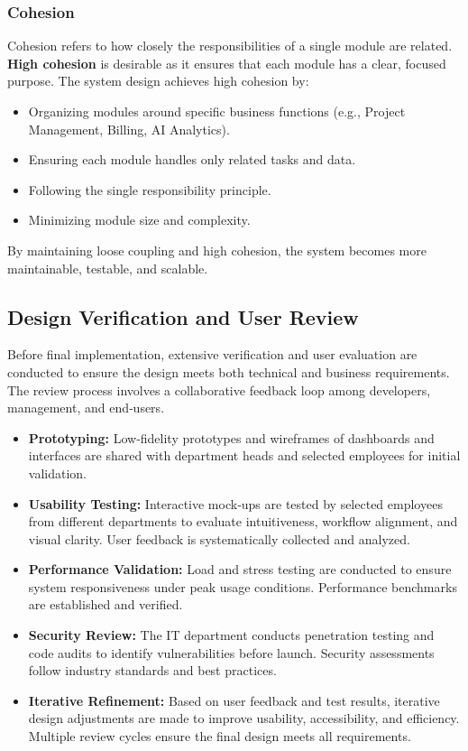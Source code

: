 \documentclass[12pt,a4paper]{article}
\begin{document}
\subsubsection{Cohesion}
Cohesion refers to how closely the responsibilities of a single module are related.  \textbf{High cohesion} is desirable as it ensures that each module has a clear, focused purpose.  The system design achieves high cohesion by:
\begin{itemize}
    \item Organizing modules around specific business functions (e.g., Project Management, Billing, AI Analytics).
    \item Ensuring each module handles only related tasks and data.
    \item Following the single responsibility principle.
    \item Minimizing module size and complexity.
\end{itemize}

By maintaining loose coupling and high cohesion, the system becomes more maintainable, testable, and scalable.

\subsection{Design Verification and User Review}
Before final implementation, extensive verification and user evaluation are conducted to ensure the design meets both technical and business requirements.  The review process involves a collaborative feedback loop among developers, management, and end‑users.

\begin{itemize}
    \item \textbf{Prototyping:} Low‑fidelity prototypes and wireframes of dashboards and interfaces are shared with department heads and selected employees for initial validation.
    
    \item \textbf{Usability Testing:} Interactive mock‑ups are tested by selected employees from different departments to evaluate intuitiveness, workflow alignment, and visual clarity.  User feedback is systematically collected and analyzed.
    
    \item \textbf{Performance Validation:} Load and stress testing are conducted to ensure system responsiveness under peak usage conditions.  Performance benchmarks are established and verified.
    
    \item \textbf{Security Review:} The IT department conducts penetration testing and code audits to identify vulnerabilities before launch.  Security assessments follow industry standards and best practices.
    
    \item \textbf{Iterative Refinement:} Based on user feedback and test results, iterative design adjustments are made to improve usability, accessibility, and efficiency.  Multiple review cycles ensure the final design meets all requirements.
\end{itemize}
\end{document}
